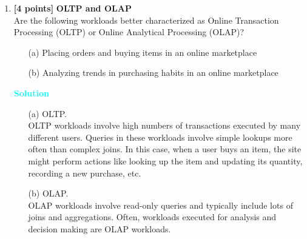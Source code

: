 \documentclass[10pt]{article}
\newenvironment{solution}
    { \begin{mdframed}[backgroundcolor=gray!10] \textcolor{cyan}{\textbf{Solution}} \\}
    {  \end{mdframed}}
\begin{document}
\begin{enumerate}
	\item \textbf{[4 points]} \textbf{OLTP and OLAP} \\
	      Are the following workloads better characterized as Online Transaction Processing (OLTP)
	      or Online Analytical Processing (OLAP)?
	      \begin{itemize}
		      \item[(a)] Placing orders and buying items in an online marketplace
		      \item[(b)] Analyzing trends in purchasing habits in an online marketplace
	      \end{itemize}
	      \begin{solution}
		      \begin{itemize}
			      \item[(a)] OLTP. \\
			            OLTP workloads involve high numbers of transactions executed by many different users.
			            Queries in these workloads involve simple lookups more often than complex
			            joins. In this case, when a user buys an item, the site might perform actions like looking
			            up the item and updating its quantity, recording a new purchase, etc.
			      \item[(b)] OLAP.\\
			            OLAP workloads involve read-only queries and typically include lots of joins
			            and aggregations. Often, workloads executed for analysis and decision making are OLAP
			            workloads.
		      \end{itemize}
	      \end{solution}



\end{enumerate}
\end{document}
